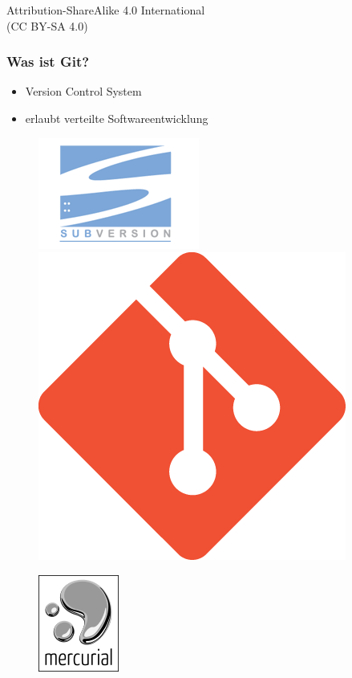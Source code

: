 \documentclass[12pt,utf8]{beamer}
\begin{document}
\begin{frame}
\begin{figure}
		\end{figure}
		\centering
		Attribution-ShareAlike 4.0 International\\(CC BY-SA 4.0) 
	\end{frame}

	\begin{frame}
		\frametitle{Was ist Git?}
		\begin{itemize}
			\item Version Control System
			\item erlaubt verteilte Softwareentwicklung
		\end{itemize}
	\end{frame}

	\begin{frame}
		\begin{figure}
			\centering
			\includegraphics[scale=0.5]{resources/subversion.png}
			\includegraphics[scale=0.2]{resources/git.png}
			
			\includegraphics[scale=0.6]{resources/mercurial.png}
			
			\tiny{\cite{subversion}}
			\tiny{\cite{git_logo}}
			\tiny{\cite{mercurial}}
		\end{figure}
	\end{frame}
\end{document}

